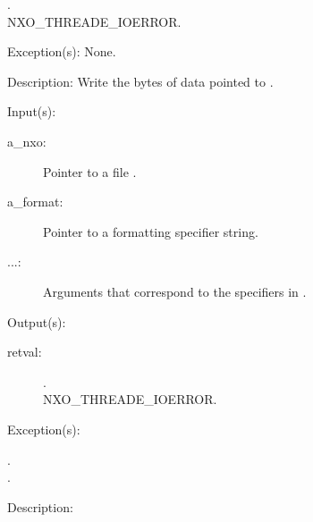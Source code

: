 \begin{capi}
\begin{capilist}
\begin{description}
			\begin{description}\item[]
			\item[.]
			\item[
				{NXO_THREADE_IOERROR}.]
			\end{description}
		\end{description}
	\item[Exception(s): ] None.
	\item[Description: ]
		Write the  bytes of data pointed to .
	\end{capilist}
\label{nxo_file_output}
	\begin{capilist}
	\item[Input(s): ]
		\begin{description}\item[]
		\item[a\_nxo: ]
			Pointer to a file .
		\item[a\_format: ]
			Pointer to a formatting specifier string.
		\item[...: ]
			Arguments that correspond to the specifiers in
			.
		\end{description}
	\item[Output(s): ]
		\begin{description}\item[]
		\item[retval: ]
			\begin{description}\item[]
			\item[.]
			\item[
				{NXO_THREADE_IOERROR}.]
			\end{description}
		\end{description}
	\item[Exception(s): ]
		\begin{description}\item[]
		\item[.]
		\item[.]
		\end{description}
	\item[Description: ]

\end{capilist}
\end{capi}
